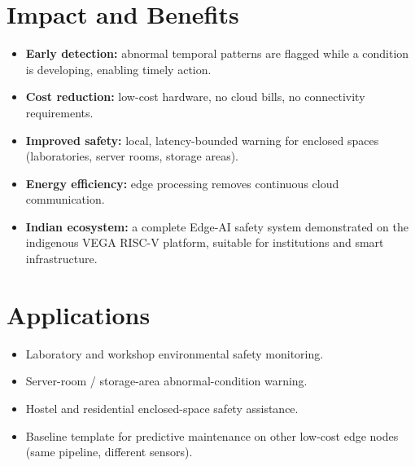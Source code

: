 \documentclass[11pt]{article}
\begin{document}
\section{Impact and Benefits}
\begin{itemize}[nosep]
  \item \textbf{Early detection:} abnormal temporal patterns are
    flagged while a condition is developing, enabling timely action.
  \item \textbf{Cost reduction:} low-cost hardware, no cloud bills, no
    connectivity requirements.
  \item \textbf{Improved safety:} local, latency-bounded warning for
    enclosed spaces (laboratories, server rooms, storage areas).
  \item \textbf{Energy efficiency:} edge processing removes continuous
    cloud communication.
  \item \textbf{Indian ecosystem:} a complete Edge-AI safety system
    demonstrated on the indigenous VEGA RISC-V platform, suitable for
    institutions and smart infrastructure.
\end{itemize}

\section{Applications}
\begin{itemize}[nosep]
  \item Laboratory and workshop environmental safety monitoring.
  \item Server-room / storage-area abnormal-condition warning.
  \item Hostel and residential enclosed-space safety assistance.
  \item Baseline template for predictive maintenance on other
    low-cost edge nodes (same pipeline, different sensors).
\end{itemize}

\end{document}
